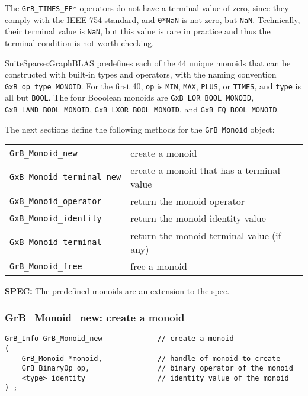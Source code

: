 \documentclass[12pt]{article}
\begin{document}
The \verb'GrB_TIMES_FP*' operators do not have a terminal value of zero, since
they comply with the IEEE 754 standard, and \verb'0*NaN' is not zero, but
\verb'NaN'.  Technically, their terminal value is \verb'NaN', but this value is
rare in practice and thus the terminal condition is not worth checking.

SuiteSparse:GraphBLAS predefines each of the 44 unique monoids that can be
constructed with built-in types and operators, with the naming convention
\verb'GxB_op_type_MONOID'.  For the first 40, \verb'op' is \verb'MIN',
\verb'MAX', \verb'PLUS', or \verb'TIMES', and \verb'type' is all but
\verb'BOOL'.  The four Booolean monoids are \verb'GxB_LOR_BOOL_MONOID',
\verb'GxB_LAND_BOOL_MONOID', \verb'GxB_LXOR_BOOL_MONOID', and
\verb'GxB_EQ_BOOL_MONOID'.

The next sections define the following methods for the \verb'GrB_Monoid'
object:

\vspace{0.2in}
{\footnotesize
\begin{tabular}{ll}
\hline
\verb'GrB_Monoid_new'       & create a monoid \\
\verb'GxB_Monoid_terminal_new'  & create a monoid that has a terminal value\\
\verb'GxB_Monoid_operator'  & return the monoid operator \\
\verb'GxB_Monoid_identity'  & return the monoid identity value \\
\verb'GxB_Monoid_terminal'  & return the monoid terminal value (if any) \\
\verb'GrB_Monoid_free'      & free a monoid \\
\hline
\end{tabular}
}
\vspace{0.2in}

\begin{spec}
{\bf SPEC:} The predefined monoids are an extension to the spec.
\end{spec}

\subsubsection{{\sf GrB\_Monoid\_new:} create a monoid}
\label{monoid_new}

\begin{mdframed}[userdefinedwidth=6in]
{\footnotesize
\begin{verbatim}
GrB_Info GrB_Monoid_new             // create a monoid
(
    GrB_Monoid *monoid,             // handle of monoid to create
    GrB_BinaryOp op,                // binary operator of the monoid
    <type> identity                 // identity value of the monoid
) ;
\end{verbatim}
} \end{mdframed}
\end{document}
